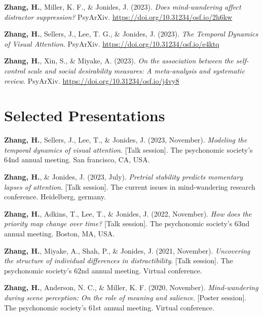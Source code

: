 \documentclass[11pt,a4paper,]{awesome-cv}
\begin{document}
\leavevmode{}%
\textbf{Zhang, H.}, Miller, K. F., \& Jonides, J. (2023). \emph{Does
mind-wandering affect distractor suppression?} PsyArXiv.
\url{https://doi.org/10.31234/osf.io/2h6kw}

\leavevmode{}%
\textbf{Zhang, H.}, Sellers, J., Lee, T. G., \& Jonides, J. (2023).
\emph{The Temporal Dynamics of Visual Attention}. PsyArXiv.
\url{https://doi.org/10.31234/osf.io/e4ktq}

\leavevmode{}%
\textbf{Zhang, H.}, Xin, S., \& Miyake, A. (2023). \emph{On the
association between the self-control scale and social desirability
measures: A meta-analysis and systematic review}. PsyArXiv.
\url{https://doi.org/10.31234/osf.io/j4vy8}

\hypertarget{selected-presentations}{%
\section{Selected Presentations}\label{selected-presentations}}

\hypertarget{bibliography}{}
\leavevmode{}%
\textbf{Zhang, H.}, Sellers, J., Lee, T., \& Jonides, J. (2023,
November). \emph{Modeling the temporal dynamics of visual attention}.
{[}Talk session{]}. The psychonomic society's 64nd annual meeting. San
francisco, CA, USA.

\leavevmode{}%
\textbf{Zhang, H.}, \& Jonides, J. (2023, July). \emph{Pretrial
stability predicts momentary lapses of attention}. {[}Talk session{]}.
The current issues in mind-wandering research conference. Heidelberg,
germany.

\leavevmode{}%
\textbf{Zhang, H.}, Adkins, T., Lee, T., \& Jonides, J. (2022,
November). \emph{How does the priority map change over time?} {[}Talk
session{]}. The psychonomic society's 63nd annual meeting. Boston, MA,
USA.

\leavevmode{}%
\textbf{Zhang, H.}, Miyake, A., Shah, P., \& Jonides, J. (2021,
November). \emph{Uncovering the structure of individual differences in
distractibility}. {[}Talk session{]}. The psychonomic society's 62nd
annual meeting. Virtual conference.

\leavevmode{}%
\textbf{Zhang, H.}, Anderson, N. C., \& Miller, K. F. (2020, November).
\emph{Mind-wandering during scene perception: On the role of meaning and
salience}. {[}Poster session{]}. The psychonomic society's 61st annual
meeting. Virtual conference.
\end{document}
